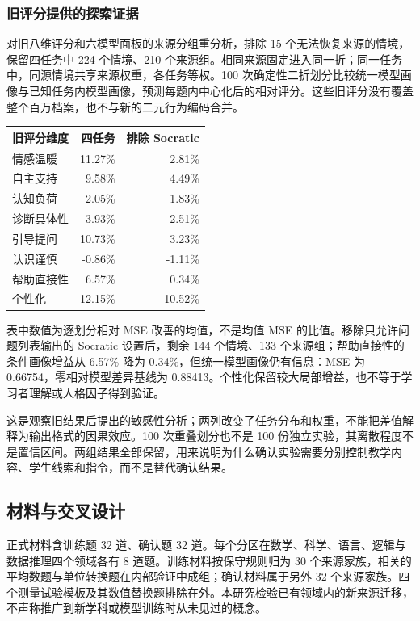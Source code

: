 \documentclass[11pt,a4paper,UTF8]{ctexart}
\begin{document}
\subsubsection{旧评分提供的探索证据}

对旧八维评分和六模型面板的来源分组重分析，排除 15 个无法恢复来源的情境，保留四任务中 224 个情境、210 个来源组。相同来源固定进入同一折；同一任务中，同源情境共享来源权重，各任务等权。100 次确定性二折划分比较统一模型画像与已知任务内模型画像，预测每题内中心化后的相对评分。这些旧评分没有覆盖整个百万档案，也不与新的二元行为编码合并。

\begin{center}\small
\begin{tabular}{lrr}
\toprule
旧评分维度 & 四任务 & 排除 Socratic \\
\midrule
情感温暖 & 11.27\% & 2.81\% \\
自主支持 & 9.58\% & 4.49\% \\
认知负荷 & 2.05\% & 1.83\% \\
诊断具体性 & 3.93\% & 2.51\% \\
引导提问 & 10.73\% & 3.23\% \\
认识谨慎 & -0.86\% & -1.11\% \\
帮助直接性 & 6.57\% & 0.34\% \\
个性化 & 12.15\% & 10.52\% \\
\bottomrule
\end{tabular}
\end{center}

表中数值为逐划分相对 MSE 改善的均值，不是均值 MSE 的比值。移除只允许问题列表输出的 Socratic 设置后，剩余 144 个情境、133 个来源组；帮助直接性的条件画像增益从 6.57\% 降为 0.34\%，但统一模型画像仍有信息：MSE 为 0.66754，零相对模型差异基线为 0.88413。个性化保留较大局部增益，也不等于学习者理解或人格因子得到验证。

这是观察旧结果后提出的敏感性分析；两列改变了任务分布和权重，不能把差值解释为输出格式的因果效应。100 次重叠划分也不是 100 份独立实验，其离散程度不是置信区间。两组结果全部保留，用来说明为什么确认实验需要分别控制教学内容、学生线索和指令，而不是替代确认结果。


\subsection{材料与交叉设计}

正式材料含训练题 32 道、确认题 32 道。每个分区在数学、科学、语言、逻辑与数据推理四个领域各有 8 道题。训练材料按保守规则归为 30 个来源家族，相关的平均数题与单位转换题在内部验证中成组；确认材料属于另外 32 个来源家族。四个测量试验模板及其数值替换题排除在外。本研究检验已有领域内的新来源迁移，不声称推广到新学科或模型训练时从未见过的概念。
\end{document}
